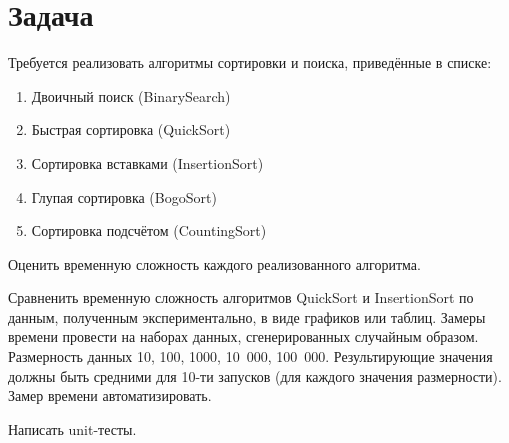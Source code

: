 \section*{Задача}

Требуется реализовать алгоритмы сортировки и поиска, приведённые в списке:

 \begin{enumerate}
    \item Двоичный поиск (BinarySearch)
    \item Быстрая сортировка (QuickSort)
    \item Сортировка вставками (InsertionSort)
    \item Глупая сортировка (BogoSort)
    \item Сортировка подсчётом (CountingSort)
 \end{enumerate}

Оценить временную сложность каждого реализованного алгоритма.

Сравненить временную сложность алгоритмов QuickSort и InsertionSort
по данным, полученным экспериментально, в виде графиков или таблиц.
Замеры времени провести на наборах данных,
сгенерированных случайным образом.
Размерность данных 10, 100, 1000, 10~000, 100~000.
Результирующие значения должны быть средними
для 10-ти запусков (для каждого значения размерности).
Замер времени автоматизировать.

Написать unit-тесты.
